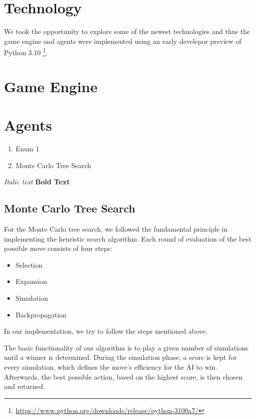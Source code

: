 \section{Technology}
We took the opportunity to explore some of the newest technologies
and thus the game engine and agents were implemented using an early develepor preview of Python 3.10
\footnote{\url{https://www.python.org/downloads/release/python-3100a7/}}.

\section{Game Engine}

\section{Agents}
\begin{enumerate}
	\item Enum 1
	\item Monte Carlo Tree Search
\end{enumerate}

\textit{Italic text}
\textbf{Bold Text}

\subsection{Monte Carlo Tree Search}
For the Monte Carlo tree search, we followed the fundamental principle in implementing the heuristic search algorithm. Each round of evaluation of the best possible move consists of four steps:
\begin{itemize}
    \item Selection
    \item Expansion
    \item Simulation
    \item Backpropagation
\end{itemize}
In our implementation, we try to follow the steps mentioned above.

The basic functionality of our algorithm is to play a given number of simulations until a winner is determined. During the simulation phase, a score is kept for every simulation, which defines the move's efficiency for the AI to win. Afterwards, the best possible action, based on the highest score, is then chosen and returned.                                     
